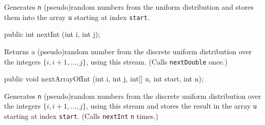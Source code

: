   \begin{tabb} Generates \texttt{n} (pseudo)random numbers from the
   uniform distribution and stores them into the array \texttt{u}
   starting at index \texttt{start}.
  \end{tabb}
\begin{htmlonly}
\end{htmlonly}
\begin{code}

   public int nextInt (int i, int j);
\end{code}
 \begin{tabb} Returns a (pseudo)random number from the discrete uniform 
   distribution over the integers $\{i,i+1,\dots,j\}$,
   using this stream.  (Calls \texttt{nextDouble} once.)
 \end{tabb}
\begin{htmlonly}
\end{htmlonly}
\begin{code}

   public void nextArrayOfInt (int i, int j, int[] u, int start, int n);
\end{code}
  \begin{tabb} Generates \texttt{n} (pseudo)random numbers
   from the discrete uniform 
   distribution over the integers $\{i,i+1,\dots,j\}$,
   using this stream and stores the result in the array \texttt{u}
   starting at index \texttt{start}.  (Calls \texttt{nextInt} \texttt{n} times.)
  \end{tabb}
\begin{htmlonly}
\end{htmlonly}
\begin{code}\begin{hide} 
}
\end{hide}
\end{code}
